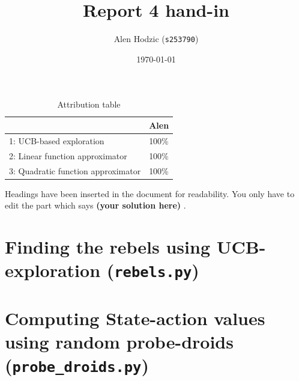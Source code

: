 \documentclass[12pt,twoside]{article}
\title{ Report 4 hand-in }
\date{ \today }
\author{Alen Hodzic (\texttt{s253790}) }
\newcommand\redt[1]{ {\textcolor[rgb]{0.60, 0.00, 0.00}{\textbf{ #1} } } }
\newcommand{\yoursolution}{ \redt{(your solution here) } }
\begin{document}
\maketitle

\begin{table}[ht!]
\centering
\caption{Attribution table}
\begin{tabular}{ll}
\toprule
                                    & Alen \\
\midrule
1: UCB-based exploration            & 100\% \\
2: Linear function approximator     & 100\% \\
3: Quadratic function approximator  & 100\% \\
\bottomrule
\end{tabular}
\end{table}


Headings have been inserted in the document for readability. You only have to edit the part which says \yoursolution. 

\section{Finding the rebels using UCB-exploration (\texttt{rebels.py})} 
\section{Computing State-action values using random probe-droids (\texttt{probe\_droids.py})} 
\end{document}
